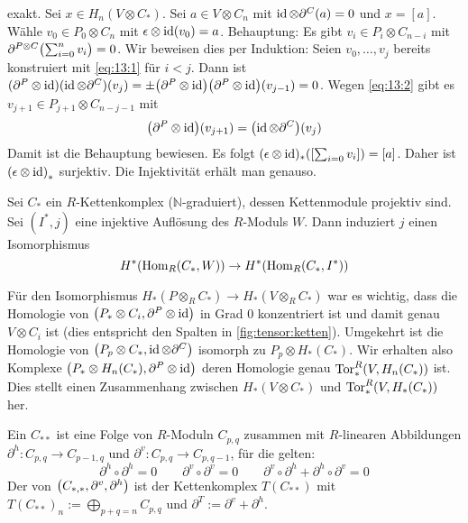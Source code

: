 \begin{beweis}
	exakt.
	Sei $x \in H_n(V \otimes C_*)$.
	Sei $a \in V \otimes C_n$ mit $\id \otimes \partial^C(a)=0$ und $x=[a]$.
	Wähle $v_0 \in P_0 \otimes C_n$ mit $\epsilon \otimes \id(v_0)=a$.
	Behauptung: Es gibt $v_i \in P_i \otimes C_{n-i}$ mit 
	\(
		\partial^{P \otimes C} \enbrace[\big]{\sum_{i=0}^{n} v_i } = 0
	\).
	Wir beweisen dies per Induktion: Seien $v_0, \ldots ,v_j$ bereits konstruiert mit \eqref{eq:13:1} für $i<j$.
	Dann ist $(\partial^P \otimes \id)(\id \otimes \partial^C)(v_j) = \pm \enbrace*{\partial^P \otimes \id} \enbrace*{\partial^P \otimes \id}(v_{j-1})=0$.
	Wegen \eqref{eq:13:2} gibt es $v_{j+1} \in P_{j+1} \otimes C_{n-j-1}$ mit 
	\[
		\enbrace*{\partial^P \otimes \id}(v_{j+1}) = \enbrace*{\id \otimes \partial^C}(v_j)
	\]
	Damit ist die Behauptung bewiesen.
	Es folgt $(\epsilon \otimes \id)_* \enbrace*{\benbrace*{\sum_{i=0} v_i}} = [a]$.
	Daher ist $\enbrace*{\epsilon \otimes \id}_*$ surjektiv. 
	Die Injektivität erhält man genauso.
\end{beweis}

\begin{lemma}
	Sei $C_*$ ein $R$-Kettenkomplex ($\mathbb{N}$-graduiert), dessen Kettenmodule projektiv sind.
	Sei $(I^*,j)$ eine injektive Auflösung des $R$-Moduls $W$.
	Dann induziert $j$ einen Isomorphismus 
	\[
		H^*\enbrace*{\Hom_R(C_*,W)} \to H^* \enbrace*{\Hom_R(C_*,I^*)}
	\]
\end{lemma}

\begin{bemerkung}
	Für den Isomorphismus $H_*(P \otimes_R C_*) \to H_*(V \otimes_R C_*)$ war es wichtig, dass die Homologie von $\enbrace*{P_* \otimes C_i,\partial^P \otimes \id}$ in Grad $0$ konzentriert ist und damit genau $V \otimes C_i$ ist (dies entspricht den Spalten in \cref{fig:tensor:ketten}).
	Umgekehrt ist die Homologie von $\enbrace*{P_p \otimes C_*, \id \otimes \partial^C}$ isomorph zu $P_p \otimes H_*(C_*)$.
	Wir erhalten also Komplexe $\enbrace*{P_* \otimes H_n(C_*), \partial^P \otimes \id}$ deren Homologie genau $\Tor^R_* \enbrace*{V, H_n(C_*)}$ ist.
	Dies stellt einen Zusammenhang zwischen $H_*(V \otimes C_*)$ und $\Tor_*^R \enbrace*{V, H_*(C_*)}$ her.
\end{bemerkung}

\begin{definition}[{name=[Doppelkomplex und Totalkomplex]}]
	Ein  $C_{**}$ ist eine Folge von $R$-Moduln $C_{p,q}$ zusammen mit $R$-linearen Abbildungen $\partial^h \colon C_{p,q} \to C_{p-1,q}$ und $\partial^v \colon C_{p,q} \to C_{p,q-1}$, für die gelten:
	\[
		\partial^h \circ \partial^h =0 \qquad \partial^v \circ \partial^v=0 \qquad \partial^v \circ \partial^h + \partial^h \circ \partial^v =0
	\]
	Der  von $\enbrace*{C_{*,*}, \partial^v,\partial^h}$ ist der Kettenkomplex $T(C_{**})$ mit $T(C_{**})_n := \bigoplus_{p+q=n} C_{p,q}$ und $\partial^T := \partial^v + \partial^h$.
\end{definition}

